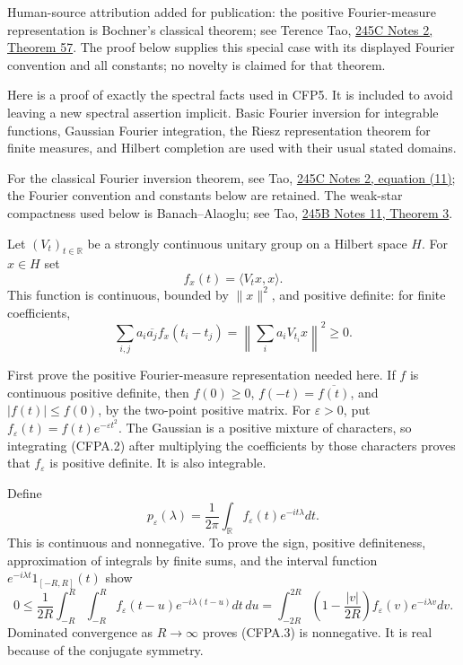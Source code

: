 Human-source attribution added for publication: the positive Fourier-measure representation is Bochner's classical theorem; see Terence Tao, \href{https://terrytao.wordpress.com/2009/04/06/the-fourier-transform/}{245C Notes 2, Theorem 57}. The proof below supplies this special case with its displayed Fourier convention and all constants; no novelty is claimed for that theorem.

Here is a proof of exactly the spectral facts used in CFP5. It is
included to avoid leaving a new spectral assertion implicit. Basic
Fourier inversion for integrable functions, Gaussian Fourier
integration, the Riesz representation theorem for finite measures, and
Hilbert completion are used with their usual stated domains.

For the classical Fourier inversion theorem, see Tao, \href{https://terrytao.wordpress.com/2009/04/06/the-fourier-transform/}{245C Notes 2, equation (11)}; the Fourier convention and constants below are retained. The weak-star compactness used below is Banach--Alaoglu; see Tao, \href{https://terrytao.wordpress.com/2009/02/21/245b-notes-11-the-strong-and-weak-topologies/}{245B Notes 11, Theorem 3}.

Let \((V_t)_{t\in\mathbb R}\) be a strongly continuous unitary group on
a Hilbert space \(H\). For \(x\in H\) set \[
f_x(t)=\langle V_tx,x\rangle.
\tag{CFPA.1}
\] This function is continuous, bounded by \(\|x\|^2\), and positive
definite: for finite coefficients, \[
\sum_{i,j}a_i\overline{a_j}f_x(t_i-t_j)
=\left\|\sum_i a_iV_{t_i}x\right\|^2\ge0.
\tag{CFPA.2}
\]

First prove the positive Fourier-measure representation needed here. If
\(f\) is continuous positive definite, then \(f(0)\ge0\),
\(f(-t)=\overline{f(t)}\), and \(|f(t)|\le f(0)\), by the two-point
positive matrix. For \(\varepsilon>0\), put
\(f_\varepsilon(t)=f(t)e^{-\varepsilon t^2}\). The Gaussian is a
positive mixture of characters, so integrating (CFPA.2) after
multiplying the coefficients by those characters proves that
\(f_\varepsilon\) is positive definite. It is also integrable.

Define \[
p_\varepsilon(\lambda)=\frac1{2\pi}
\int_{\mathbb R}f_\varepsilon(t)e^{-it\lambda}dt.
\tag{CFPA.3}
\] This is continuous and nonnegative. To prove the sign, positive
definiteness, approximation of integrals by finite sums, and the
interval function \(e^{-i\lambda t}1_{[-R,R]}(t)\) show \[
0\le\frac1{2R}\int_{-R}^R\int_{-R}^R
f_\varepsilon(t-u)e^{-i\lambda(t-u)}dt\,du
=\int_{-2R}^{2R}
\left(1-\frac{|v|}{2R}\right)
f_\varepsilon(v)e^{-i\lambda v}dv.
\] Dominated convergence as \(R\to\infty\) proves (CFPA.3) is
nonnegative. It is real because of the conjugate symmetry.

